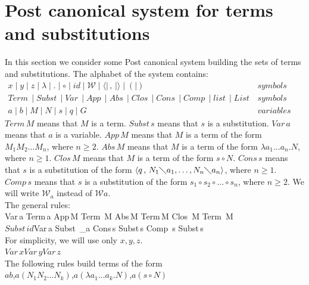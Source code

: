\documentclass[11pt]{amsart}
\def\ruleone#1#2{\prooftree #1 \justifies #2 \endprooftree}
\theoremstyle{plain}
\theoremstyle{definition}
\theoremstyle{remark}
\numberwithin{equation}{section}
\newcommand{\ci}{\circ}
\newcommand{\mi}{\,,\,}
\newcommand{\is}{\diagdown}
\newcommand{\la}{\langle}
\newcommand{\ra}{\rangle}
\newcommand{\term}{Term\,}
\newcommand{\sub}{Subst\,}
\newcommand{\var}{Var\,}
\newcommand{\absterm}{Abs\,}
\newcommand{\appterm}{App\,}
\newcommand{\closterm}{Clos\,}
\newcommand{\compsub}{Comp\,}
\newcommand{\conssub}{Cons\,}
\newcommand{\varlist}{list\,}
\newcommand{\slist}{List\,}
\renewcommand{\pi}{\mathcal{W}}
\begin{document}
\section{Post canonical system for terms and substitutions}
In this section we consider some Post canonical system building
the sets of terms and substitutions. The alphabet of the system
contains:\\[3pt]
$ \begin{array}{ll}
 x\mid y\mid z\mid \lambda\mid .\mid \ci\mid
id\mid \pi\mid \la\mid \mi\mid\ra\mid (\mid ) & symbols\\
\term\mid \sub\mid \var\mid \appterm\mid \absterm\mid
\closterm\mid \conssub\mid \compsub \mid
 \varlist\mid \slist
&
symbols\\
 a\mid b\mid M\mid N\mid s\mid q\mid G & variables
\end{array}$\\[5pt]

$\term M$ means that $M$ is a term. $\sub s$ means that $s$ is a
substitution. $\var a$ means that $a$ is a variable. $\appterm M$
means that $M$ is a term of the form $M_1M_2\ldots M_n$, where
$n\geqslant 2$. $\absterm M$ means that $M$ is a term of the form
$\lambda a_1\ldots a_n.N$, where $n\geqslant 1$. $\closterm M$
means that $M$ is a term of the form $s\ci N$. $\conssub s$ means
that $s$ is a substitution of the form $\la q\mi N_1\is
a_1,\ldots,N_n\is a_n\ra$, where $n\geqslant 1$. $\compsub s$
means that $s$ is a substitution of the form $s_1\ci
s_2\ci\ldots\ci
s_n$, where $n\geqslant 2$. We will write $\pi_a$ instead of $\pi a$.\\[5pt]

The general rules:\\[5pt]

\ruleone{\var a}{\term a}\qquad \ruleone{\appterm  M}{\term
M}\qquad \ruleone{\absterm  M}{\term M}\qquad\ruleone{\closterm
M}{\term
M}\\[10pt]

$\sub  id$\qquad\ruleone{\var  a}{\sub
\pi_a}\qquad\ruleone{\conssub s}{\sub  s}\qquad\ruleone{\compsub
s}{\sub  s}\\[10pt]

For simplicity, we will use only $x,y,z$.\\[3pt]

$\var x$\qquad$\var y$\qquad$\var z$\\[5pt]


The following rules build terms of the form\\[1pt]
$ab$,\quad $a(N_1N_2\ldots N_k)$,\quad $a(\lambda a_1\ldots a_k.N)$,\quad $a(s\ci N)$\\[5pt]
\end{document}
